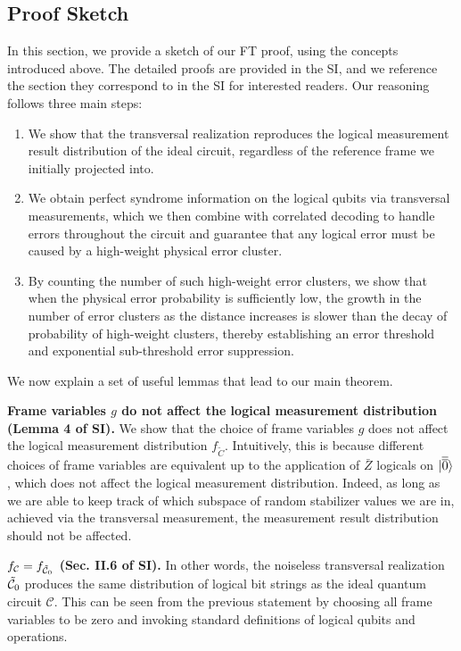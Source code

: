 \subsection{Proof Sketch}
\label{methods:proof_sketch}
In this section, we provide a sketch of our FT proof, using the concepts introduced above.
%
The detailed proofs are provided in the SI, and we reference the section they correspond to in the SI for interested readers.
%
Our reasoning follows three main steps:
%
\begin{enumerate}
\item We show that the transversal realization reproduces the logical measurement result distribution of the ideal circuit, regardless of the reference frame we initially projected into.
\item We obtain perfect syndrome information on the logical qubits via transversal measurements, which we then combine with correlated decoding to handle errors throughout the circuit and guarantee that any logical error must be caused by a high-weight physical error cluster.
\item By counting the number of such high-weight error clusters, we show that when the physical error probability is sufficiently low, the growth in the number of error clusters as the distance increases is slower than the decay of probability of high-weight clusters, thereby establishing an error threshold and exponential sub-threshold error suppression.
\end{enumerate}

We now explain a set of useful lemmas that lead to our main theorem.

\textbf{Frame variables $g$ do not affect the logical measurement distribution (Lemma 4 of SI).}
%
We show that the choice of frame variables $g$ does not affect the logical measurement distribution $f_{\tilde{C}}$.
%
Intuitively, this is because different choices of frame variables are equivalent up to the application of $\bar{Z}$ logicals on $|\overline{\overline{0}}\rangle$, which does not affect the logical measurement distribution.
%
Indeed, as long as we are able to keep track of which subspace of random stabilizer values we are in, achieved via the transversal measurement, the measurement result distribution should not be affected.

\textbf{$f_{\mathcal{C}}=f_{\tilde{\mathcal{C}}_0}$ (Sec. II.6 of SI).}
%
In other words, the noiseless transversal realization $\tilde{\mathcal{C}}_0$ produces the same distribution of logical bit strings as the ideal quantum circuit $\mathcal{C}$.
%
This can be seen from the previous statement by choosing all frame variables to be zero and invoking standard definitions of logical qubits and operations.

